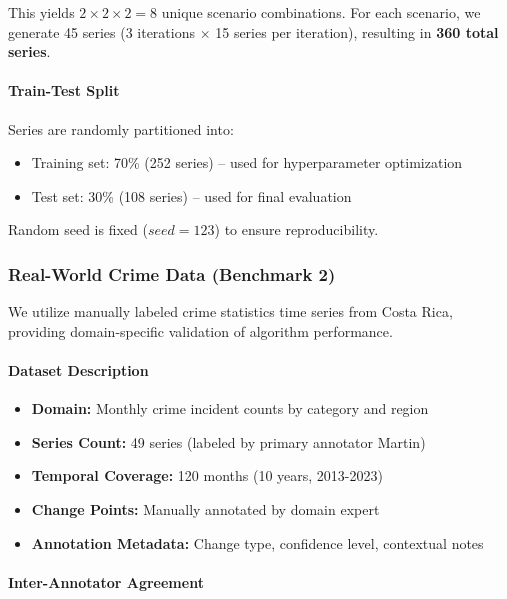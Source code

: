 This yields $2 \times 2 \times 2 = 8$ unique scenario combinations. For each scenario, we generate 45 series (3 iterations $\times$ 15 series per iteration), resulting in \textbf{360 total series}.

\paragraph{Train-Test Split}

Series are randomly partitioned into:
\begin{itemize}
    \item Training set: 70\% (252 series) -- used for hyperparameter optimization
    \item Test set: 30\% (108 series) -- used for final evaluation
\end{itemize}

Random seed is fixed ($seed=123$) to ensure reproducibility.

\subsubsection{Real-World Crime Data (Benchmark 2)}
\label{sec:real_data}

We utilize manually labeled crime statistics time series from Costa Rica, providing domain-specific validation of algorithm performance.

\paragraph{Dataset Description}

\begin{itemize}
    \item \textbf{Domain:} Monthly crime incident counts by category and region
    \item \textbf{Series Count:} 49 series (labeled by primary annotator Martin)
    \item \textbf{Temporal Coverage:} 120 months (10 years, 2013-2023)
    \item \textbf{Change Points:} Manually annotated by domain expert
    \item \textbf{Annotation Metadata:} Change type, confidence level, contextual notes
\end{itemize}

\paragraph{Inter-Annotator Agreement}

